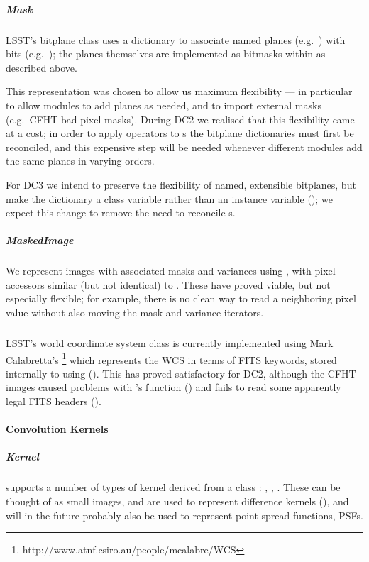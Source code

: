 \subparagraph{Mask}
LSST's bitplane class uses a dictionary to associate named planes
(e.g.~) with bits (e.g.~); the planes themselves
are implemented as bitmasks within  as described above.

This representation was chosen to allow us maximum flexibility --- in
particular to allow modules to add planes as needed, and to import
external masks (e.g.~CFHT bad-pixel masks).  During DC2 we realised
that this flexibility came at a cost;  in order to apply operators
to s the bitplane dictionaries must first be reconciled,
and this expensive step will be needed whenever different modules
add the same planes in varying orders.

For DC3 we intend to preserve the flexibility of named, extensible
bitplanes, but make the dictionary a class variable rather than an instance
variable ();  we expect this change to remove the
need to reconcile s.

\subparagraph{MaskedImage}
We represent images with associated masks and variances using ,
with pixel accessors similar (but not identical) to .
These have proved viable, but not especially flexible;  for example, there is
no clean way to read a neighboring pixel value without also moving the mask and
variance iterators.

\subparagraph{}
LSST's world coordinate system class is currently implemented using Mark Calabretta's 
\footnote{http://www.atnf.csiro.au/people/mcalabre/WCS}
which represents the WCS in terms of FITS keywords, stored internally to 
using  ().  This has proved satisfactory
for DC2, although the CFHT images caused problems with 's 
function () and  fails to read some apparently legal
FITS headers ().

\paragraph{Convolution Kernels}

\subparagraph{Kernel}
 supports a number of types of kernel derived from a class :
,
, .  These can be thought
of as small images, and are used to represent difference kernels (), and
will in the future probably also be used to represent point spread functions,
PSFs.

